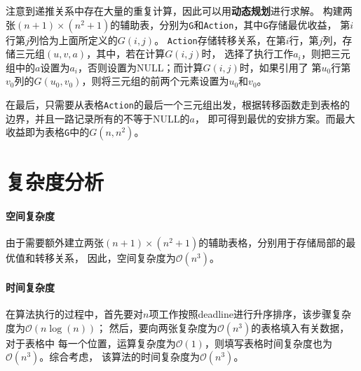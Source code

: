 \documentclass{article}
\begin{document}
注意到递推关系中存在大量的重复计算，因此可以用\textbf{动态规划}进行求解。
构建两张$(n+1)\times(n^2+1)$的辅助表，分别为\texttt{G}和\texttt{Action}，其中\texttt{G}存储最优收益，
第$i$行第$j$列恰为上面所定义的$G(i,j)$。
\texttt{Action}存储转移关系，在第$i$行，第$j$列，存储三元组$(u,v,a)$，其中，若在计算$G(i,j)$时，
选择了执行工作$a_i$，则把三元组中的$a$设置为$a_i$，否则设置为NULL；而计算$G(i,j)$时，如果引用了
第$u_0$行第$v_0$列的$G(u_0,v_0)$，则将三元组的前两个元素设置为$u_0$和$v_0$。

在最后，只需要从表格\texttt{Action}的最后一个三元组出发，根据转移函数走到表格的边界，并且一路记录所有的不等于NULL的$a$，
即可得到最优的安排方案。而最大收益即为表格\texttt{G}中的$G(n,n^2)$。



\section{复杂度分析}
\paragraph{空间复杂度}
由于需要额外建立两张$(n+1)\times(n^2+1)$的辅助表格，分别用于存储局部的最优值和转移关系，
因此，空间复杂度为$\mathcal{O}(n^3)$。 

\paragraph{时间复杂度}
在算法执行的过程中，首先要对$n$项工作按照deadline进行升序排序，该步骤复杂度为$\mathcal{O}(n\log(n))$；
然后，要向两张复杂度为$\mathcal{O}(n^3)$的表格填入有关数据，对于表格中
每一个位置，运算复杂度为$\mathcal{O}(1)$，则填写表格时间复杂度也为$\mathcal{O}(n^3)$。综合考虑，
该算法的时间复杂度为$\mathcal{O}(n^3)$。
\end{document}
